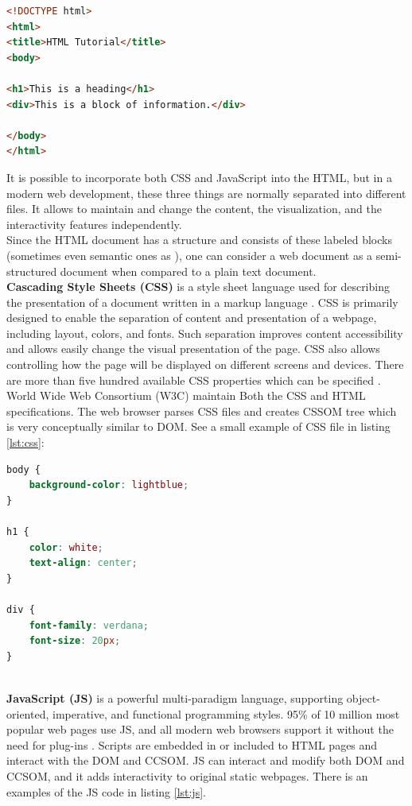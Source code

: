 \begin{lstlisting}[language=html, caption={A small example of HTML file}, label={lst:html}, captionpos=b]
<!DOCTYPE html>
<html>
<title>HTML Tutorial</title>
<body>

<h1>This is a heading</h1>
<div>This is a block of information.</div>

</body>
</html>
\end{lstlisting}

It is possible to incorporate both CSS and JavaScript into the HTML, but in a modern web development, these three things are normally separated into different files. It allows to maintain and change the content, the visualization, and the interactivity features independently.\\

Since the HTML document has a structure and consists of these labeled blocks (sometimes even semantic ones as ), one can consider a web document as a semi-structured document when compared to a plain text document.\\

\noindent\textbf{Cascading Style Sheets (CSS)} is a style sheet language used for describing the presentation of a document written in a markup language \cite{CSSMoz}. CSS is primarily designed to enable the separation of content and presentation of a webpage, including layout, colors, and fonts. Such separation improves content accessibility and allows easily change the visual presentation of the page. CSS also allows controlling how the page will be displayed on different screens and devices. There are more than five hundred available CSS properties which can be specified \cite{W3Schools}. World Wide Web Consortium (W3C) maintain Both the CSS and HTML specifications. The web browser parses CSS files and creates CSSOM tree which is very conceptually similar to DOM. See a small example of CSS file in listing \ref{lst:css}: \\

\begin{lstlisting}[language=css, caption={A small example of CSS file}, label={lst:css}, captionpos=b]
body {
    background-color: lightblue;
}

h1 {
    color: white;
    text-align: center;
}

div {
    font-family: verdana;
    font-size: 20px;
}
\end{lstlisting}\\

\noindent\textbf{JavaScript (JS)} is a powerful multi-paradigm language, supporting object-oriented, imperative, and functional programming styles. 95\% of 10 million most popular web pages use JS, and all modern web browsers support it without the need for plug-ins \cite{W3Schools}. Scripts are embedded in or included to HTML pages and interact with the DOM and CCSOM. JS can interact and modify both DOM and CCSOM, and it adds interactivity to original static webpages. There is an examples of the JS code in listing \ref{lst:js}.\\

